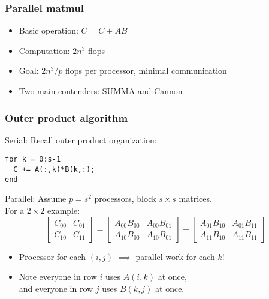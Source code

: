 \documentclass{beamer}
\begin{document}
\begin{frame}
  \titlepage
\end{frame}


\begin{frame}
  \frametitle{Parallel matmul}

  \begin{itemize}
  \item Basic operation: $C = C+AB$
  \item Computation: $2n^3$ flops
  \item Goal: $2n^3/p$ flops per processor, minimal communication
  \item Two main contenders: SUMMA and Cannon
  \end{itemize}
\end{frame}



\begin{frame}[fragile]
  \frametitle{Outer product algorithm}

  Serial: Recall outer product organization:
\begin{lstlisting}
for k = 0:s-1
  C += A(:,k)*B(k,:);
end
\end{lstlisting}

  \vspace{5mm}
  Parallel: Assume $p = s^2$ processors, block $s \times s$ matrices. \\
  For a $2 \times 2$ example:
  \[
  \begin{bmatrix}
    C_{00} & C_{01} \\
    C_{10} & C_{11}
  \end{bmatrix} =
  \begin{bmatrix}
    A_{00} B_{00} & A_{00} B_{01} \\
    A_{10} B_{00} & A_{10} B_{01} 
  \end{bmatrix} +
  \begin{bmatrix}
    A_{01} B_{10} & A_{01} B_{11} \\
    A_{11} B_{10} & A_{11} B_{11} 
  \end{bmatrix}
  \]

\begin{itemize}
\item
  Processor for each $(i,j)$ $\implies$ parallel work for each $k$!
\item
  Note everyone in row $i$ uses $A(i,k)$ at once, \\
  and everyone in row $j$ uses $B(k,j)$ at once.
\end{itemize}

\end{frame}
\end{document}
